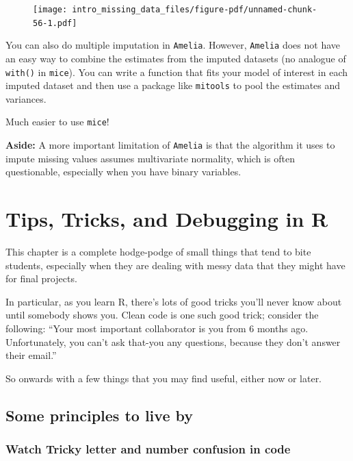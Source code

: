 \documentclass[
  letterpaper,
  DIV=11,
  numbers=noendperiod]{scrreprt}
\begin{document}
\begin{figure}[H]

{\centering \texttt{[image: intro\_missing\_data\_files/figure-pdf/unnamed-chunk-56-1.pdf]}

}

\end{figure}

You can also do multiple imputation in \texttt{Amelia}. However,
\texttt{Amelia} does not have an easy way to combine the estimates from
the imputed datasets (no analogue of \texttt{with()} in \texttt{mice}).
You can write a function that fits your model of interest in each
imputed dataset and then use a package like \texttt{mitools} to pool the
estimates and variances.

Much easier to use \texttt{mice}!

\textbf{Aside:} A more important limitation of \texttt{Amelia} is that
the algorithm it uses to impute missing values assumes multivariate
normality, which is often questionable, especially when you have binary
variables.

\hypertarget{tips-tricks-and-debugging-in-r}{%
\chapter{Tips, Tricks, and Debugging in
R}\label{tips-tricks-and-debugging-in-r}}

This chapter is a complete hodge-podge of small things that tend to bite
students, especially when they are dealing with messy data that they
might have for final projects.

In particular, as you learn R, there's lots of good tricks you'll never
know about until somebody shows you. Clean code is one such good trick;
consider the following: ``Your most important collaborator is you from 6
months ago. Unfortunately, you can't ask that-you any questions, because
they don't answer their email.''

So onwards with a few things that you may find useful, either now or
later.

\hypertarget{some-principles-to-live-by}{%
\section{Some principles to live by}\label{some-principles-to-live-by}}

\hypertarget{watch-tricky-letter-and-number-confusion-in-code}{%
\subsection{Watch Tricky letter and number confusion in
code}\label{watch-tricky-letter-and-number-confusion-in-code}}
\end{document}
